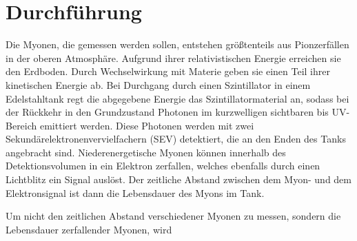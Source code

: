 \section{Durchf\"{u}hrung}

Die Myonen, die gemessen werden sollen, entstehen größtenteils aus Pionzerfällen in der oberen Atmosphäre. Aufgrund ihrer relativistischen Energie erreichen sie den Erdboden. Durch Wechselwirkung mit Materie geben sie einen Teil ihrer kinetischen Energie ab. Bei Durchgang durch einen Szintillator in einem Edelstahltank regt die abgegebene Energie das Szintillatormaterial an, sodass bei der Rückkehr in den Grundzustand Photonen im kurzwelligen sichtbaren bis UV-Bereich emittiert werden. Diese Photonen werden mit zwei Sekundärelektronenvervielfachern (SEV) detektiert, die an den Enden des Tanks angebracht sind. Niederenergetische Myonen können innerhalb des Detektionsvolumen in ein Elektron zerfallen, welches ebenfalls durch einen Lichtblitz ein Signal auslöst. Der zeitliche Abstand zwischen dem Myon- und dem Elektronsignal ist dann die Lebensdauer des Myons im Tank.

Um nicht den zeitlichen Abstand verschiedener Myonen zu messen, sondern die Lebensdauer zerfallender Myonen, wird
